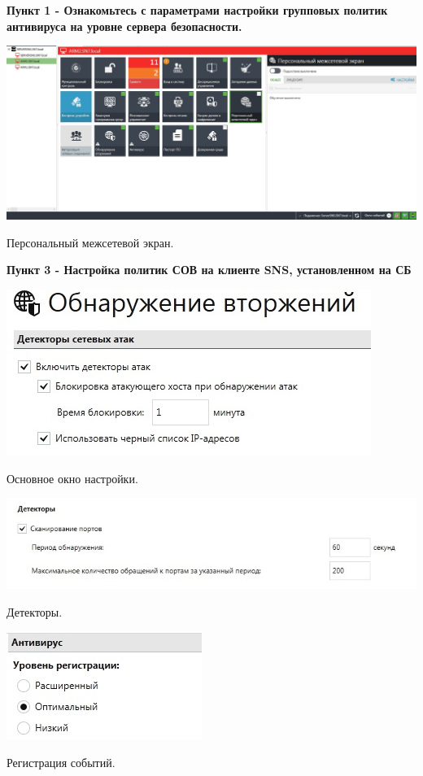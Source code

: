 \documentclass[a4paper,14pt]{extarticle}
\begin{document}
    \textbf{Пункт 1 - Ознакомьтесь с параметрами настройки групповых политик антивируса на
уровне сервера безопасности.}
    \begin{center}
        \includegraphics[scale=0.3]{pics/1.jpg}

      Персональный межсетевой экран.
    \end{center}

    \textbf{Пункт 3 - Настройка политик СОВ на клиенте SNS, установленном на СБ}
    \begin{center}
        \includegraphics[scale=0.8]{pics/3_1.jpg}

        Основное окно настройки.

        \includegraphics[scale=0.65]{pics/3_2.jpg}

        Детекторы.

        \includegraphics[scale=0.8]{pics/3_3.jpg}
 
        Регистрация событий.
    \end{center}
\end{document}
